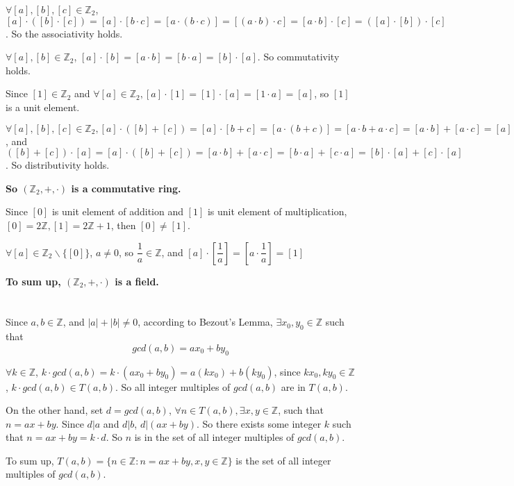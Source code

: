 \documentclass[a4paper,12pt,titlepage]{article}
\begin{document}
$\forall [a],[b],[c]\in \mathbb{Z}_2$, $[a]\cdot([b]\cdot [c])=[a]\cdot[b\cdot c]=[a\cdot(b\cdot c)]=[(a\cdot b)\cdot c]=[a\cdot b]\cdot[c]=([a]\cdot [b])\cdot [c]$. So the associativity holds.

$\forall [a],[b]\in \mathbb{Z}_2$, $[a]\cdot[b]=[a\cdot b]=[b\cdot a]=[b]\cdot[a]$. So commutativity holds.
 
Since $[1]\in\mathbb{Z}_2$ and $\forall [a]\in\mathbb{Z}_2,[a]\cdot[1]=[1]\cdot[a]=[1\cdot a]=[a]$, so $[1]$ is a unit element.

$\forall [a],[b],[c]\in \mathbb{Z}_2, [a]\cdot([b]+[c])=[a]\cdot[b+c]=[a\cdot(b+c)]=[a\cdot b+a\cdot c]=[a\cdot b]+[a\cdot c]=[a]\cdot [b]+[a]\cdot[c]$, and $([b]+[c])\cdot [a]=[a]\cdot ([b]+[c])=[a\cdot b]+[a\cdot c]=[b\cdot a]+[c\cdot a]=[b]\cdot [a]+[c]\cdot [a]$. So distributivity holds.

\textbf{So $(\mathbb{Z}_2,+,\cdot)$ is a commutative ring.}

Since $[0]$ is unit element
of addition and $[1]$ is unit element of multiplication, $[0]=2\mathbb{Z},[1]=2\mathbb{Z}+1$, then $[0]\neq[1]$.

$\forall [a]\in\mathbb{Z}_2\backslash\lbrace[0]\rbrace$, $a\neq 0$, so $\dfrac{1}{a}\in\mathbb{Z}$, and $[a]\cdot[\dfrac{1}{a}]=[a\cdot\dfrac{1}{a}]=[1]$

\textbf{To sum up, $(\mathbb{Z}_2,+,\cdot)$ is a field.}

\section{}
Since $a,b\in \mathbb{Z}$, and $|a|+|b|\neq0$, according to Bezout's Lemma, $\exists x_0,y_0\in\mathbb{Z}$ such that
$$gcd(a,b)=ax_0+by_0$$ 

$\forall k\in\mathbb{Z}$, $k\cdot gcd(a,b)=k\cdot(ax_0+by_0)=a(kx_0)+b(ky_0)$, since $kx_0,ky_0\in\mathbb{Z}$, $k\cdot gcd(a,b)\in T(a,b)$. So all integer multiples of $gcd(a, b)$ are in $T(a,b)$.

On the other hand, set $d=gcd(a,b)$, $\forall n\in T(a,b),\exists x,y\in\mathbb{Z}$, such that $n=ax+by$. Since $d|a$ and $d|b$, $d|(ax+by)$. So there exists some integer $k$ such that $n=ax+by=k\cdot d$. So $n$ is in the set of all integer multiples of $gcd(a, b)$.

To sum up, $T(a,b)=\lbrace n\in\mathbb{Z}:n=ax+by,x,y\in\mathbb{Z}\rbrace$  
is the set of all integer multiples of $gcd(a, b)$.
\end{document}
